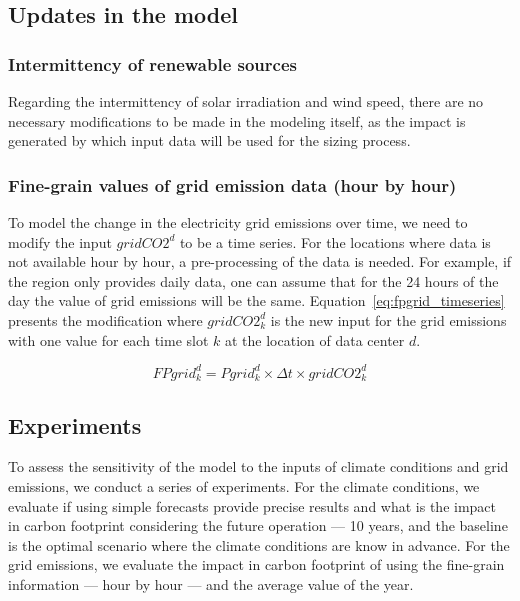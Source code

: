 \subsection{Updates in the model}

\subsubsection{Intermittency of renewable sources}

Regarding the intermittency of solar irradiation and wind speed, there are no necessary modifications to be made in the modeling itself, as the impact is generated by which input data will be used for the sizing process.

\subsubsection{Fine-grain values of grid emission data (hour by hour)}

To model the change in the electricity grid emissions over time, we need to modify the input $gridCO2^d$ to be a time series. For the locations where data is not available hour by hour, a pre-processing of the data is needed. For example, if the region only provides daily data, one can assume that for the 24 hours of the day the value of grid emissions will be the same. Equation~\eqref{eq:fpgrid_timeseries} presents the modification where $gridCO2^d_k$ is the new input for the grid emissions with one value for each time slot $k$ at the location of data center $d$.


\begin{equation} \label{eq:fpgrid_timeseries}
FPgrid_k^d = Pgrid_k^d\times \Delta t \times gridCO2^d_k
\end{equation}

\subsection{Experiments}

To assess the sensitivity of the model to the inputs of climate conditions and grid emissions, we conduct a series of experiments. For the climate conditions, we evaluate if using simple forecasts provide precise results and what is the impact in carbon footprint considering the future operation --- 10 years, and the baseline is the optimal scenario where the climate conditions are know in advance. For the grid emissions, we evaluate the impact in carbon footprint of using the fine-grain information --- hour by hour --- and the average value of the year.



